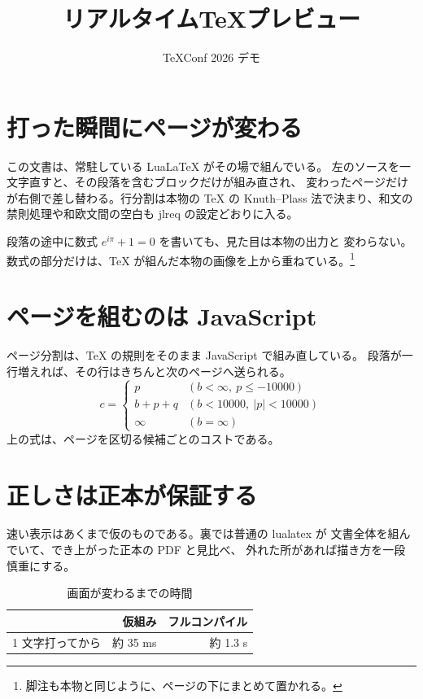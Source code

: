 \documentclass[paper=a4paper,fontsize=11pt]{jlreq}
\title{リアルタイム\TeX プレビュー}
\author{TeXConf 2026 デモ}
\date{}
\begin{document}
\maketitle

\section{打った瞬間にページが変わる}

この文書は、常駐している Lua\LaTeX{} がその場で組んでいる。
左のソースを一文字直すと、その段落を含むブロックだけが組み直され、
変わったページだけが右側で差し替わる。行分割は本物の \TeX{} の
Knuth--Plass 法で決まり、和文の禁則処理や和欧文間の空白も
jlreq の設定どおりに入る。

段落の途中に数式 $e^{i\pi} + 1 = 0$ を書いても、見た目は本物の出力と
変わらない。数式の部分だけは、\TeX{} が組んだ本物の画像を上から重ねている。\footnote{脚注も本物と同じように、ページの下にまとめて置かれる。}

\section{ページを組むのは JavaScript}

ページ分割は、\TeX{} の規則をそのまま JavaScript で組み直している。
段落が一行増えれば、その行はきちんと次のページへ送られる。
\begin{equation}
  c = \begin{cases}
    p & (b < \infty,\ p \le -10000) \\
    b + p + q & (b < 10000,\ |p| < 10000) \\
    \infty & (b = \infty)
  \end{cases}
\end{equation}
上の式は、ページを区切る候補ごとのコストである。

\section{正しさは正本が保証する}

速い表示はあくまで仮のものである。裏では普通の lualatex が
文書全体を組んでいて、でき上がった正本の PDF と見比べ、
外れた所があれば描き方を一段慎重にする。

\begin{table}[htbp]
  \centering
  \begin{tabular}{lrr}
    \hline
    & 仮組み & フルコンパイル \\
    \hline
    1 文字打ってから & 約 35 ms & 約 1.3 s \\
    \hline
  \end{tabular}
  \caption{画面が変わるまでの時間}
\end{table}
\end{document}
